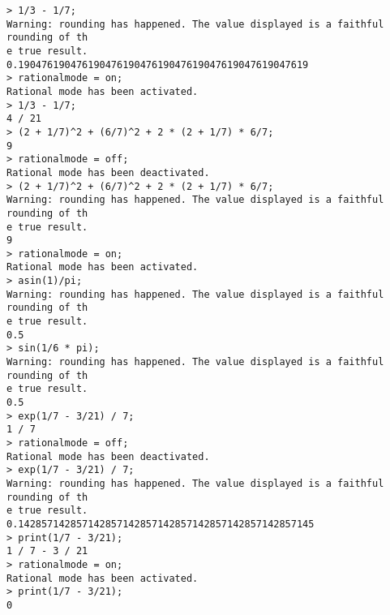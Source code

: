 \begin{center}\begin{minipage}{15cm}\begin{Verbatim}[frame=single]
> 1/3 - 1/7;
Warning: rounding has happened. The value displayed is a faithful rounding of th
e true result.
0.19047619047619047619047619047619047619047619047619
> rationalmode = on;
Rational mode has been activated.
> 1/3 - 1/7;
4 / 21
> (2 + 1/7)^2 + (6/7)^2 + 2 * (2 + 1/7) * 6/7;
9
> rationalmode = off;
Rational mode has been deactivated.
> (2 + 1/7)^2 + (6/7)^2 + 2 * (2 + 1/7) * 6/7;
Warning: rounding has happened. The value displayed is a faithful rounding of th
e true result.
9
> rationalmode = on;
Rational mode has been activated.
> asin(1)/pi;
Warning: rounding has happened. The value displayed is a faithful rounding of th
e true result.
0.5
> sin(1/6 * pi);
Warning: rounding has happened. The value displayed is a faithful rounding of th
e true result.
0.5
> exp(1/7 - 3/21) / 7;
1 / 7
> rationalmode = off;
Rational mode has been deactivated.
> exp(1/7 - 3/21) / 7;
Warning: rounding has happened. The value displayed is a faithful rounding of th
e true result.
0.142857142857142857142857142857142857142857142857145
> print(1/7 - 3/21);
1 / 7 - 3 / 21
> rationalmode = on;
Rational mode has been activated.
> print(1/7 - 3/21);
0
\end{Verbatim}
\end{minipage}\end{center}
